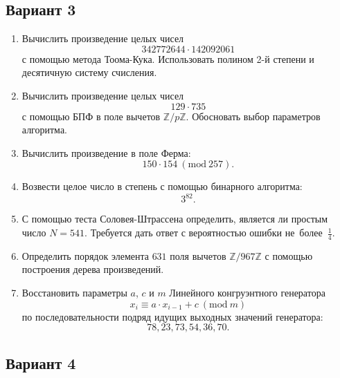 \documentclass[14pt]{extarticle}
\begin{document}
\clearpage	\subsection{Вариант 3}
	\begin{enumerate}
		\item Вычислить произведение целых чисел \[342772644 \cdot 142092061\] с помощью метода Тоома-Кука. Использовать полином 2-й степени и десятичную систему счисления.
		\item Вычислить произведение целых чисел \[129 \cdot 735\] с помощью БПФ в поле вычетов $\mathbb{Z}/p\mathbb{Z}$. Обосновать выбор параметров алгоритма.
		\item Вычислить произведение в поле Ферма: \[150 \cdot 154\ (\textrm{mod}\ 257).\]
		\item Возвести целое число в степень с помощью бинарного алгоритма: \[3^{82}.\]
		\item С помощью теста Соловея-Штрассена определить, является ли простым число $N = 541$. Требуется дать ответ с вероятностью ошибки не~более~$\frac14$.
		\item Определить порядок элемента $631$ поля вычетов $\mathbb{Z}/967\mathbb{Z}$ с помощью построения дерева произведений.
		\item Восстановить параметры $a$, $c$ и $m$ Линейного конгруэнтного генератора \[x_i \equiv a \cdot x_{i-1} + c\ (\textrm{mod}\ m)\] по последовательности подряд идущих выходных значений генератора: \[78, 23, 73, 54, 36, 70.\]
	\end{enumerate}
\clearpage	\subsection{Вариант 4}
\end{document}
